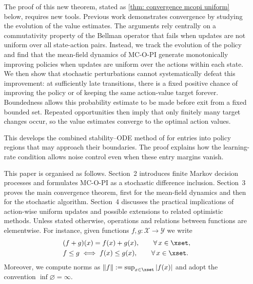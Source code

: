 

The proof of this new theorem, stated as \autoref{thm: convergence mcopi uniform} below, requires new tools.
Previous work demonstrates convergence by studying the evolution of the value estimates. The arguments rely centrally on a commutativity property of the Bellman operator that fails when updates are not uniform over all state-action pairs.
Instead, we track the evolution of the policy and find that the mean-field dynamics of MC-O-PI generate monotonically improving policies when updates are uniform over the actions within each state.
We then show that stochastic perturbations cannot systematically defeat this improvement: at sufficiently late transitions, there is a fixed positive chance of improving the policy or of keeping the same action-value target forever. Boundedness allows this probability estimate to be made before exit from a fixed bounded set. Repeated opportunities then imply that only finitely many target changes occur, so the value estimates converge to the optimal action values.

This develops the combined stability--ODE method of \citet[Section~5.4]{Kushner2003StochasticApplications} for entries into policy regions that may approach their boundaries. The proof explains how the learning-rate condition allows noise control even when these entry margins vanish.

This paper is organised as follows. Section~2 introduces finite Markov decision
processes and formulates MC-O-PI as a stochastic difference inclusion. Section~3 proves the
main convergence theorem, first for the mean-field dynamics and then for the stochastic
algorithm. Section~4 discusses the practical implications of action-wise uniform updates
and possible extensions to related optimistic methods.
Unless stated otherwise, operations and relations between functions are elementwise. For instance, given functions $f, g : \mathcal X \to \mathcal Y$ we write
\begin{align*}
&(f + g)(x) = f(x) + g(x), \qquad \forall \, x \in \xset ,
    \\
&f \le g \iff f(x) \le g(x), \qquad \forall \, x \in \xset .
\end{align*}
Moreover, we compute norms as $\|f\| := \sup_{x \in \xset} |f(x)|$
and adopt the convention $\inf \varnothing = \infty$.


